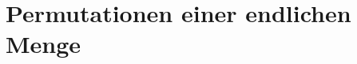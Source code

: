 %
%
%
\section{Permutationen einer endlichen Menge
\label{section:permutationen-einer-endlichen-menge}}

